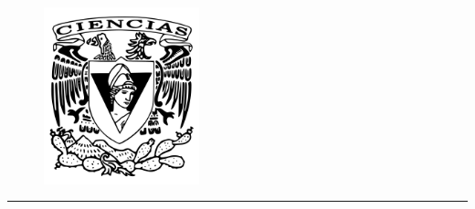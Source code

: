 \documentclass[a4paper]{article}
\begin{document}
\begin{minipage}{0.295\textwidth} 
\raggedleft
\footnotesize
\begin{figure} %
    \includegraphics[width=0.4\textwidth]{style/ciencias.png}
\end{figure}
\end{minipage}
\medskip\hrule 
\bigskip






\end{document}
